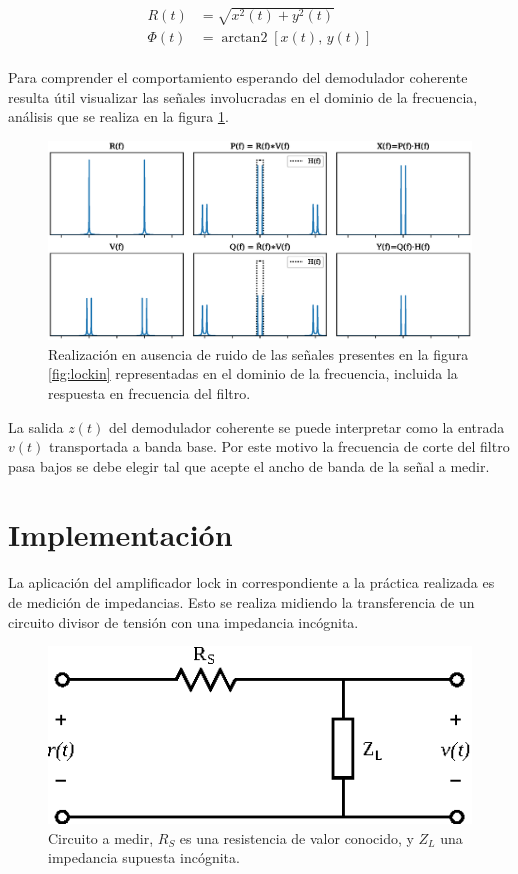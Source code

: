 \documentclass[11pt,a4paper]{extarticle}
\DeclareMathOperator{\arctantwo}{arctan2}
\begin{document}
\begin{multicols}{2}
\begin{equation}\label{eq:ampfase}
	\begin{aligned}
		R(t) &= \sqrt{x^2(t)+y^2(t)}\\[0.5em]
		\Phi(t) &= \arctantwo\left[x(t), \, y(t)\right]
	\end{aligned}
\end{equation}\\[-1em]

Para comprender el comportamiento esperando del demodulador coherente resulta útil visualizar las señales involucradas en el dominio de la frecuencia, análisis que se realiza en la figura \ref{fig:sigs_fourier}.

\begin{figure}[H]
	\centering
	\includegraphics[width=\linewidth]{Images/sigs_fourier.eps}
	\caption{Realización en ausencia de ruido de las señales presentes en la figura \ref{fig:lockin} representadas en el dominio de la frecuencia, incluida la respuesta en frecuencia del filtro.}
	\label{fig:sigs_fourier}
\end{figure}

La salida $z(t)$ del demodulador coherente se puede interpretar como la entrada $v(t)$ transportada a banda base. Por este motivo la frecuencia de corte del filtro pasa bajos se debe elegir tal que acepte el ancho de banda de la señal a medir.

\section{Implementación}

La aplicación del amplificador lock in correspondiente a la práctica realizada es de medición de impedancias. Esto se realiza midiendo la transferencia de un circuito divisor de tensión con una impedancia incógnita.

\begin{figure}[H]
	\centering
	\includegraphics[width=0.7\linewidth]{Images/transferencia.eps}
	\caption{Circuito a medir, $R_S$ es una resistencia de valor conocido, y $Z_L$ una impedancia supuesta incógnita.}
	\label{fig:transferencia}
\end{figure}


\end{multicols}
\end{document}
